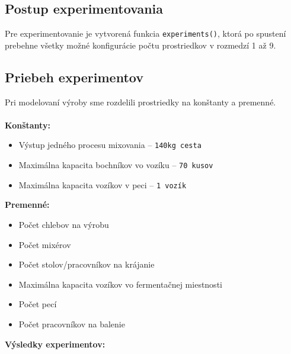 \documentclass[a4paper, 10pt]{article}
\begin{document}
    \subsection{Postup experimentovania}
    Pre experimentovanie je vytvorená funkcia \texttt{experiments()}, ktorá po spustení prebehne všetky možné
    konfigurácie počtu prostriedkov v rozmedzí 1 až 9.

    \subsection{Priebeh experimentov}
    Pri modelovaní výroby sme rozdelili prostriedky na konštanty a premenné.\\ \\
    \textbf{Konštanty:}
    \begin{itemize}
        \item Výstup jedného procesu mixovania -- \texttt{140kg cesta}
        \item Maximálna kapacita bochníkov vo vozíku -- \texttt{70 kusov}
        \item Maximálna kapacita vozíkov v peci -- \texttt{1 vozík}
    \end{itemize}
    \textbf{Premenné:}
    \begin{itemize}
        \item Počet chlebov na výrobu
        \item Počet mixérov
        \item Počet stolov/pracovníkov na krájanie
        \item Maximálna kapacita vozíkov vo fermentačnej miestnosti
        \item Počet pecí
        \item Počet pracovníkov na balenie
    \end{itemize}
    \textbf{Výsledky experimentov:}\\
\end{document}
